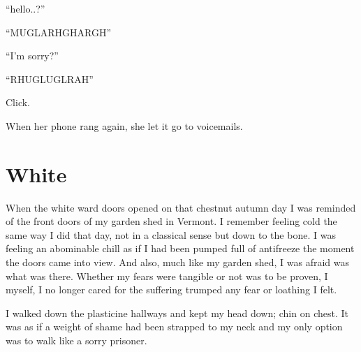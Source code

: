 ``hello..?''



``MUGLARHGHARGH''



``I'm sorry?''



``RHUGLUGLRAH''



Click.



When her phone rang again, she let it go to voicemails. 

 



%
%
%
%
%
%
%
%
%
%
%
%
% 
% 
%
%
%
%
%
%
%
%
% 
%
%

\chapter{ White}

When the white ward doors opened on that chestnut autumn day I was
reminded of the front doors of my garden shed in Vermont. I
remember feeling cold the same way I did that day, not in a
classical sense but down to the bone. I was feeling an abominable
chill as if I had been pumped full of antifreeze the moment the
doors came into view. And also, much like my garden shed, I was
afraid was what was there. Whether my fears were tangible or not
was to be proven, I myself, I no longer cared for the suffering
trumped any fear or loathing I felt.



I walked down the plasticine hallways and kept my head down; chin
on chest. It was as if a weight of shame had been strapped to my
neck and my only option was to walk like a sorry prisoner.



